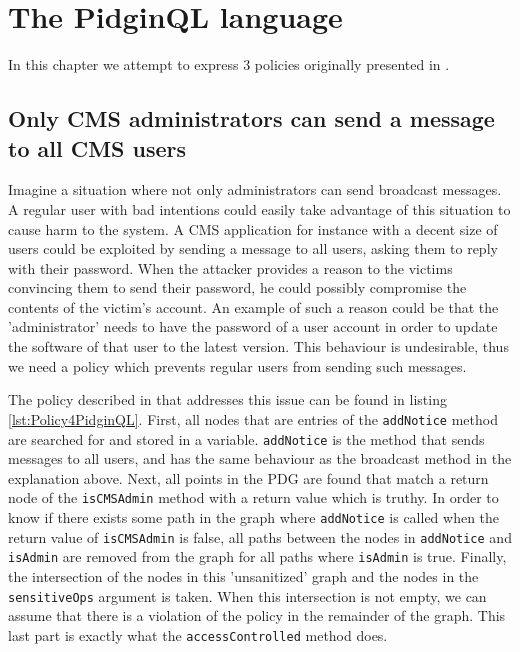 \section{The PidginQL language}
\label{sec:ValidationPidginQL}

In this chapter we attempt to express 3 policies originally presented in \cite{PidginQLTechReport}.

\subsection{Only CMS administrators can send a message to all CMS users}
Imagine a situation where not only administrators can send broadcast messages. A regular user with bad intentions could easily take advantage of this situation to cause harm to the system. A CMS application for instance with a decent size of users could be exploited by sending a message to all users, asking them to reply with their password. When the attacker provides a reason to the victims convincing them to send their password, he could possibly compromise the contents of the victim's account. An example of such a reason could be that the 'administrator' needs to have the password of a user account in order to update the software of that user to the latest version. This behaviour is undesirable, thus we need a policy which prevents regular users from sending such messages.

The policy described in \cite{PidginQLTechReport} that addresses this issue can be found in listing \ref{lst:Policy4PidginQL}. First, all nodes that are entries of the \texttt{addNotice} method are searched for and stored in a variable. \texttt{addNotice} is the method that sends messages to all users, and has the same behaviour as the broadcast method in the explanation above. Next, all points in the PDG are found that match a return node of the \texttt{isCMSAdmin} method with a return value which is truthy. In order to know if there exists some path in the graph where \texttt{addNotice} is called when the return value of \texttt{isCMSAdmin} is false, all paths between the nodes in \texttt{addNotice} and \texttt{isAdmin} are removed from the graph for all paths where \texttt{isAdmin} is true. Finally, the intersection of the nodes in this 'unsanitized' graph and the nodes in the \texttt{sensitiveOps} argument is taken. When this intersection is not empty, we can assume that there is a violation of the policy in the remainder of the graph. This last part is exactly what the \texttt{accessControlled} method does.

